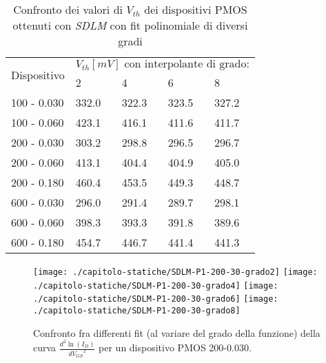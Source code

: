 \begin{table}[h]
  \renewcommand{\arraystretch}{1.3}
  \centering
  \begin{tabular}{m{2.1cm} m{2cm} m{2cm} m{2cm} m{2cm}}
    \toprule
    \multirow{2}{*}{Dispositivo} & \multicolumn{4}{c}{$V_{th} [mV] \text{ con interpolante di grado:}$}                         \\
    \cmidrule{2-5}
                                 & 2                                                                    & 4     & 6     & 8     \\
    \midrule
    100 - 0.030                  & 332.0                                                                & 322.3 & 323.5 & 327.2 \\
    \hline
    100 - 0.060                  & 423.1                                                                & 416.1 & 411.6 & 411.7 \\
    \hline
    200 - 0.030                  & 303.2                                                                & 298.8 & 296.5 & 296.7 \\
    \hline
    200 - 0.060                  & 413.1                                                                & 404.4 & 404.9 & 405.0 \\
    \hline
    200 - 0.180                  & 460.4                                                                & 453.5 & 449.3 & 448.7 \\
    \hline
    600 - 0.030                  & 296.0                                                                & 291.4 & 289.7 & 298.1 \\
    \hline
    600 - 0.060                  & 398.3                                                                & 393.3 & 391.8 & 389.6 \\
    \hline
    600 - 0.180                  & 454.7                                                                & 446.7 & 441.4 & 441.3 \\
    \hline
  \end{tabular}
  \caption{Confronto dei valori di $V_{th}$ dei dispositivi PMOS ottenuti con \emph{SDLM} con fit polinomiale di diversi gradi}
  \label{tab:GradiSDLM}
\end{table}

\begin{figure}[h!]
  \centering
  \texttt{[image: ./capitolo-statiche/SDLM-P1-200-30-grado2]}
  \texttt{[image: ./capitolo-statiche/SDLM-P1-200-30-grado4]}
  \texttt{[image: ./capitolo-statiche/SDLM-P1-200-30-grado6]}
  \texttt{[image: ./capitolo-statiche/SDLM-P1-200-30-grado8]}
  \caption{Confronto fra differenti fit (al variare del grado della funzione) della curva $\frac{d^2 \ln(I_D)}{d {V_{GS}}^2}$ per un dispositivo PMOS 200-0.030.}
  \label{fig:GradiSDLM}
\end{figure}

